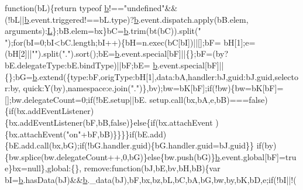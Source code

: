 \begin{DoxyCode}
{      function}(bL)\{\textcolor{keywordflow}{return} typeof \hyperlink{docs_2_programmer's_manual_2html_2jquery_8js_aa4026ad5544b958e54ce5e106fa1c805}{b}!==\textcolor{stringliteral}{"undefined"}&&(!bL||\hyperlink{docs_2_programmer's_manual_2html_2jquery_8js_aa4026ad5544b958e54ce5e106fa1c805}{b}.event.triggered!==bL.type)?\hyperlink{docs_2_programmer's_manual_2html_2jquery_8js_aa4026ad5544b958e54ce5e106fa1c805}{b}.event.dispatch.apply(bB.elem,
      arguments):\hyperlink{docs_2_programmer's_manual_2html_2jquery_8js_a38ee4c0b5f4fe2a18d0c783af540d253}{L}\};bB.elem=bx\}bC=\hyperlink{docs_2_programmer's_manual_2html_2jquery_8js_aa4026ad5544b958e54ce5e106fa1c805}{b}.trim(bt(bC)).split(\textcolor{stringliteral}{" "});\textcolor{keywordflow}{for}(bI=0;bI<bC.length;bI++)\{bH=n.exec(bC[bI])||[];bF=
      bH[1];e=(bH[2]||\textcolor{stringliteral}{""}).split(\textcolor{stringliteral}{"."}).sort();bE=\hyperlink{docs_2_programmer's_manual_2html_2jquery_8js_aa4026ad5544b958e54ce5e106fa1c805}{b}.event.special[bF]||\{\};bF=(by?bE.delegateType:bE.bindType)||bF;bE=
      \hyperlink{docs_2_programmer's_manual_2html_2jquery_8js_aa4026ad5544b958e54ce5e106fa1c805}{b}.event.special[bF]||\{\};bG=\hyperlink{docs_2_programmer's_manual_2html_2jquery_8js_aa4026ad5544b958e54ce5e106fa1c805}{b}.extend(\{type:bF,origType:bH[1],data:bA,handler:bJ,guid:bJ.guid,selector:by,
      quick:Y(by),\textcolor{keyword}{namespace}:e.join(\textcolor{stringliteral}{"."})\},bv);bw=bK[bF];\textcolor{keywordflow}{if}(!bw)\{bw=bK[bF]=[];bw.delegateCount=0;\textcolor{keywordflow}{if}(!bE.setup||bE.
      setup.call(bx,bA,e,bB)===\textcolor{keyword}{false})\{\textcolor{keywordflow}{if}(bx.addEventListener)\{bx.addEventListener(bF,bB,\textcolor{keyword}{false})\}\textcolor{keywordflow}{else}\{\textcolor{keywordflow}{if}(bx.attachEvent
      )\{bx.attachEvent(\textcolor{stringliteral}{"on"}+bF,bB)\}\}\}\}\textcolor{keywordflow}{if}(bE.add)\{bE.add.call(bx,bG);\textcolor{keywordflow}{if}(!bG.handler.guid)\{bG.handler.guid=bJ.guid\}\}\textcolor{keywordflow}{
      if}(by)\{bw.splice(bw.delegateCount++,0,bG)\}\textcolor{keywordflow}{else}\{bw.push(bG)\}\hyperlink{docs_2_programmer's_manual_2html_2jquery_8js_aa4026ad5544b958e54ce5e106fa1c805}{b}.event.global[bF]=\textcolor{keyword}{true}\}bx=null\},global:\{\},\textcolor{keyword}{
      remove}:\textcolor{keyword}{function}(bJ,bE,bv,bH,bB)\{var bI=\hyperlink{docs_2_programmer's_manual_2html_2jquery_8js_aa4026ad5544b958e54ce5e106fa1c805}{b}.hasData(bJ)&&\hyperlink{docs_2_programmer's_manual_2html_2jquery_8js_aa4026ad5544b958e54ce5e106fa1c805}{b}.\_data(bJ),bF,bx,bz,bL,bC,bA,bG,bw,by,bK,bD,e;\textcolor{keywordflow}{if}(!bI||!(

\end{DoxyCode}
